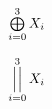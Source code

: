 \documentclass[10pt,a4paper]{article}
\newcommand{\bigxor}{%
		\mathop{%
			\mathchoice
			{\textstyle\bigoplus}{\textstyle\bigoplus}
			{\scriptstyle\bigoplus}{\scriptscriptstyle\bigoplus}%
		}%
	}
\newcommand{\bigconc}{\mathop{\mathpalette\bigconcinn\relax}}
\newcommand{\bigconcinn}[2]{%
		\vcenter{\hbox{$\bigconcchoose#1\bigconcsize|\mkern1mu\bigconcsize|$}}%
	}
\newcommand{\bigconcchoose}[1]{%
		\def\bigconcsize{}%
		\ifx#1\displaystyle
			\let\bigconcsize\Big
		\else
			\ifx#1\textstyle
				\let\bigconcsize\big
			\fi
		\fi#1%
	}
\begin{document}
\[ \bigxor_{i=0}^{3} X_{i} \]

\[ \bigconc_{i=0}^{3} X_{i} \]
\end{document}

